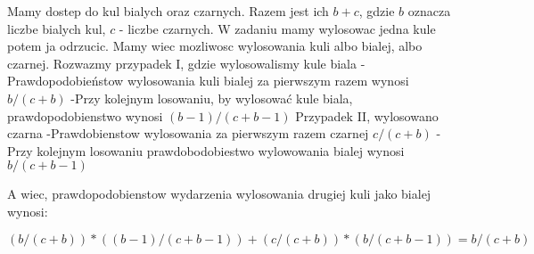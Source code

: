 Mamy dostep do kul bialych oraz czarnych. Razem jest ich $b+c$, gdzie  $b$ oznacza liczbe bialych kul, $c$ - liczbe czarnych.
W zadaniu mamy wylosowac jedna kule potem ja odrzucic. Mamy wiec mozliwosc wylosowania kuli albo bialej, albo czarnej.
Rozwazmy przypadek I, gdzie wylosowalismy kule biala
  -Prawdopodobieństow wylosowania kuli bialej za pierwszym razem wynosi $b/(c+b)$
  -Przy kolejnym losowaniu, by wylosować kule biala, prawdopodobienstwo wynosi $(b-1)/(c+b-1)$
Przypadek II, wylosowano czarna
  -Prawdobienstow wylosowania za pierwszym razem czarnej $c/(c+b)$
  -Przy kolejnym losowaniu prawdobodobiestwo wylowowania bialej wynosi $b/(c+b-1)$
  
A wiec, prawdopodobienstow wydarzenia wylosowania drugiej kuli jako bialej wynosi:
\begin{center}
      $(b/(c+b))*((b-1)/(c+b-1)) + (c/(c+b))*(b/(c+b-1)) = b/(c+b)$
\end{center}

